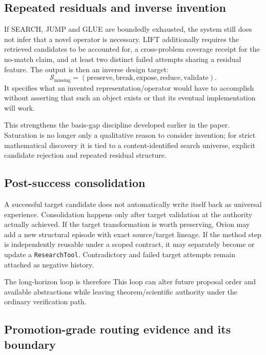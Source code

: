 \subsection{Repeated residuals and inverse invention}

If SEARCH, JUMP and GLUE are boundedly exhausted, the system still does not infer that a novel operator is necessary. LIFT additionally requires the retrieved candidates to be accounted for, a cross-problem coverage receipt for the no-match claim, and at least two distinct failed attempts sharing a residual feature. The output is then an inverse design target:
\[
\mathcal{S}_{\mathrm{missing}}
=
(\text{preserve},\text{break},\text{expose},\text{reduce},\text{validate}).
\]
It specifies what an invented representation/operator would have to accomplish without asserting that such an object exists or that its eventual implementation will work.

This strengthens the basis-gap discipline developed earlier in the paper. Saturation is no longer only a qualitative reason to consider invention; for strict mathematical discovery it is tied to a content-identified search universe, explicit candidate rejection and repeated residual structure.

\subsection{Post-success consolidation}

A successful target candidate does not automatically write itself back as universal experience. Consolidation happens only after target validation at the authority actually achieved. If the target transformation is worth preserving, Orion may add a new structural episode with exact source/target lineage. If the method step is independently reusable under a scoped contract, it may separately become or update a \texttt{ResearchTool}. Contradictory and failed target attempts remain attached as negative history.

The long-horizon loop is therefore
This loop can alter future proposal order and available abstractions while leaving theorem/scientific authority under the ordinary verification path.

\subsection{Promotion-grade routing evidence and its boundary}

